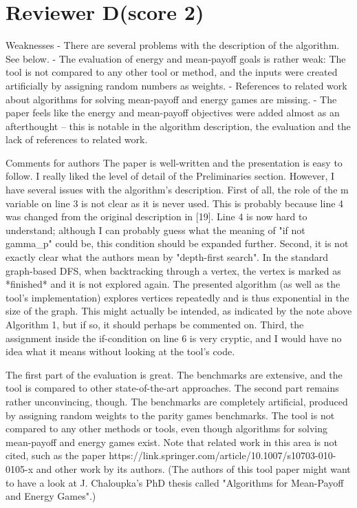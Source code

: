 \documentclass{article}
\begin{document}

\section{Reviewer D(score 2)}\label{rev:D}
\begin{reviewer}
Weaknesses
- There are several problems with the description of the algorithm. See below.
- The evaluation of energy and mean-payoff goals is rather weak: The tool is not compared to any other tool or method, and the inputs were created artificially by assigning random numbers as weights.
- References to related work about algorithms for solving mean-payoff and energy games are missing.
- The paper feels like the energy and mean-payoff objectives were added almost as an afterthought – this is notable in the algorithm description, the evaluation and the lack of references to related work.

Comments for authors
The paper is well-written and the presentation is easy to follow. I really liked the level of detail of the Preliminaries section. However, I have several issues with the algorithm's description. First of all, the role of the m variable on line 3 is not clear as it is never used. This is probably because line 4 was changed from the original description in [19]. Line 4 is now hard to understand; although I can probably guess what the meaning of "if not gamma_p" could be, this condition should be expanded further. Second, it is not exactly clear what the authors mean by "depth-first search". In the standard graph-based DFS, when backtracking through a vertex, the vertex is marked as *finished* and it is not explored again. The presented algorithm (as well as the tool's implementation) explores vertices repeatedly and is thus exponential in the size of the graph. This might actually be intended, as indicated by the note above Algorithm 1, but if so, it should perhaps be commented on. Third, the assignment inside the if-condition on line 6 is very cryptic, and I would have no idea what it means without looking at the tool's code.

The first part of the evaluation is great. The benchmarks are extensive, and the tool is compared to other state-of-the-art approaches. The second part remains rather unconvincing, though. The benchmarks are completely artificial, produced by assigning random weights to the parity games benchmarks. The tool is not compared to any other methods or tools, even though algorithms for solving mean-payoff and energy games exist. Note that related work in this area is not cited, such as the paper https://link.springer.com/article/10.1007/s10703-010-0105-x and other work by its authors. (The authors of this tool paper might want to have a look at J. Chaloupka's PhD thesis called "Algorithms for Mean-Payoff and Energy Games".)


\end{reviewer}
\end{document}
